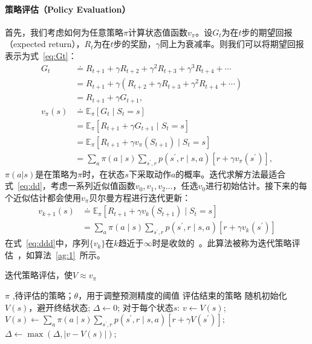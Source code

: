 \paragraph{策略评估（Policy Evaluation）}
首先，我们考虑如何为任意策略$\pi$计算状态值函数$v_{\pi}$。设$G_{t}$为在$t$步的期望回报（expected return），$R_{t}$为在$t$步的奖励，$\gamma$同上为衰减率。则我们可以将期望回报表示为式~\eqref{eq:Gt}：
  \begin{align}
  G_{t} & \doteq R_{t+1}+\gamma R_{t+2}+\gamma^{2} R_{t+3}+\gamma^{3} R_{t+4}+\cdots \nonumber\\
  &=R_{t+1}+\gamma\left(R_{t+2}+\gamma R_{t+3}+\gamma^{2} R_{t+4}+\cdots\right) \nonumber\\
  &=R_{t+1}+\gamma G_{t+1},\label{eq:Gt}\\
  v_{\pi}(s) & \doteq \mathbb{E}_{\pi}\left[G_{t} \mid S_{t}=s\right] \nonumber\\
  &=\mathbb{E}_{\pi}\left[R_{t+1}+\gamma G_{t+1} \mid S_{t}=s\right] \nonumber\\
  &=\mathbb{E}_{\pi}\left[R_{t+1}+\gamma v_{\pi}\left(S_{t+1}\right) \mid S_{t}=s\right] \nonumber\\
  &=\sum_{a} \pi(a \mid s) \sum_{s^{\prime}, r} p\left(s^{\prime}, r \mid s, a\right)\left[r+\gamma v_{\pi}\left(s^{\prime}\right)\right],
  \label{eq:dd}
  \end{align}
$\pi(a|s)$是在策略为$\pi$时，在状态$s$下采取动作$a$的概率。迭代求解方法最适合式~\eqref{eq:dd}，考虑一系列近似值函数$v_{0},v_{1},v_{2}\dots$，任选$v_{0}$进行初始估计。接下来的每个近似估计都会使用$v_{\pi}$贝尔曼方程\cite{dixit1990optimization}进行迭代更新：
\begin{equation}
  \begin{aligned}
  v_{k+1}(s) & \doteq \mathbb{E}_{\pi}\left[R_{t+1}+\gamma v_{k}\left(S_{t+1}\right) \mid S_{t}=s\right] \\
  &=\sum_{a} \pi(a \mid s) \sum_{s^{\prime}, r} p\left(s^{\prime}, r \mid s, a\right)\left[r+\gamma v_{k}\left(s^{\prime}\right)\right]
  \end{aligned}
  \label{eq:ddd}
\end{equation}
在式~\ref{eq:ddd}中，序列$\{v_{k}\}$在$k$趋近于$\infty$时是收敛的~\cite{kamien2013dynamic}。此算法被称为迭代策略评估~\cite{Sutton1998}，如算法~\ref{ag:1}~所示。
\begin{algorithm}[!t]
  \caption{迭代策略评估，使$V\approx v_{\pi} $}
  \begin{algorithmic}[1]
    \Require $\pi$ ,待评估的策略；$\theta$，用于调整预测精度的阈值
    \Ensure 评估结束的策略
    \State 随机初始化$V(s)$，避开终结状态;
    \Repeat
    \State $\Delta\leftarrow 0$;
    \Loop 对于每个状态$s$:
    \State $v \leftarrow V(s)$;
    \State $V(s) \leftarrow \sum_{a} \pi(a \mid s) \sum_{s^{\prime}, r} p\left(s^{\prime}, r \mid s, a\right)\left[r+\gamma V\left(s^{\prime}\right)\right]$;
    \State $\Delta \leftarrow \max (\Delta,|v-V(s)|)$;
    \EndLoop
    \Until{ $\Delta \le \theta$}
  \end{algorithmic}
  \label{ag:1}
\end{algorithm}
